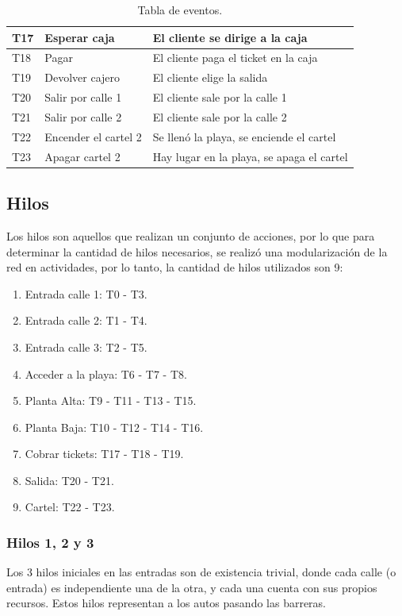 \documentclass[12pt,a4paper]{article}
\begin{document}
\begin{table}[H]
\begin{tabular}[width=15cm]{ || C{1.5cm} | L{5cm} | L{8.5cm} || }
	T17 & Esperar caja & El cliente se dirige a la caja  \\ \hline
	T18 & Pagar & El cliente paga el ticket en la caja  \\ \hline
	T19 & Devolver cajero & El cliente elige la salida \\ \hline
	T20 & Salir por calle 1 & El cliente sale por la calle 1  \\ \hline
	T21 & Salir por calle 2 & El cliente sale por la calle 2   \\ \hline
	T22 & Encender el cartel 2 & Se llenó la playa, se enciende el cartel   \\ \hline
	T23 & Apagar cartel 2 & Hay lugar en la playa, se apaga el cartel   \\ \hline
\end{tabular}
\caption{Tabla de eventos.}
\label{table:transiciones}
\end{table}

\subsection{Hilos}
 Los hilos son aquellos que realizan un conjunto de acciones, por lo que para determinar la cantidad de hilos necesarios, se realizó una modularización de la red en actividades, por lo tanto, la cantidad de hilos utilizados son 9:

\begin{enumerate}[leftmargin=1.5cm]
\item Entrada calle 1: T0 - T3.
\item Entrada calle 2: T1 - T4.
\item Entrada calle 3: T2 - T5.
\item Acceder a la playa: T6 - T7 - T8.
\item Planta Alta: T9 - T11 - T13 - T15.
\item Planta Baja: T10 - T12 - T14 - T16.
\item Cobrar tickets: T17 - T18 - T19.
\item Salida: T20 - T21.
\item Cartel: T22 - T23.
\end{enumerate}

\subsubsection*{Hilos 1, 2 y 3}
Los 3 hilos iniciales en las entradas son de existencia trivial, donde cada calle (o entrada) es independiente una de la otra, y cada una cuenta con sus propios recursos. Estos hilos representan a los autos pasando las barreras.
\end{document}
